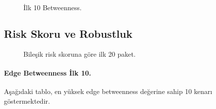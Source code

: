 \documentclass[11pt,a4paper]{article}
\begin{document}
\begin{figure}[h]
  \centering
  \caption{İlk 10 Betweenness.}
\end{figure}

\subsection{Risk Skoru ve Robustluk}
\begin{figure}[h]
  \centering
  \caption{Bileşik risk skoruna göre ilk 20 paket.}
\end{figure}

\paragraph{Edge Betweenness İlk 10.} Aşağıdaki tablo, en yüksek edge betweenness değerine sahip 10 kenarı göstermektedir.
\end{document}
